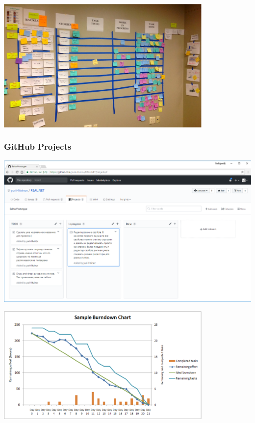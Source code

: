 \documentclass{../../slides-style}
\begin{document}
    \begin{frame}
        \begin{center}
            \includegraphics[width=0.8\textwidth]{kanban.png}
        \end{center}
    \end{frame}

    \begin{frame}
        \frametitle{GitHub Projects}
        \begin{center}
            \includegraphics[width=\textwidth]{githubProjects.png}
        \end{center}
    \end{frame}

    \begin{frame}
        \begin{center}
            \includegraphics[width=0.8\textwidth]{burndownChart.png}
        \end{center}
    \end{frame}
\end{document}
